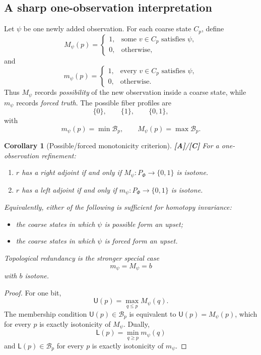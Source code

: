 \documentclass[11pt]{article}
\newtheorem{corollary}[theorem]{Corollary}
\theoremstyle{definition}
\newcommand{\statusA}{\textbf{[A]}}
\newcommand{\statusC}{\textbf{[C]}}
\begin{document}
\subsection{A sharp one-observation interpretation}

Let \(\psi\) be one newly added observation. For each coarse state \(C_p\), define
\[
M_\psi(p)=
\begin{cases}
1,&\text{some }v\in C_p\text{ satisfies }\psi,\\
0,&\text{otherwise},
\end{cases}
\]
and
\[
m_\psi(p)=
\begin{cases}
1,&\text{every }v\in C_p\text{ satisfies }\psi,\\
0,&\text{otherwise}.
\end{cases}
\]
Thus \(M_\psi\) records \emph{possibility} of the new observation inside a coarse state, while \(m_\psi\) records \emph{forced truth}. The possible fiber profiles are
\[
\{0\},\qquad\{1\},\qquad\{0,1\},
\]
with
\[
m_\psi(p)=\min\mathcal B_p,
\qquad
M_\psi(p)=\max\mathcal B_p.
\]

\begin{corollary}[Possible/forced monotonicity criterion]\label{cor:possibleforced}
\statusA/\statusC\;
For a one-observation refinement:
\begin{enumerate}[label=(\roman*)]
\item \(r\) has a right adjoint if and only if \(M_\psi:P_\Phi\to\{0,1\}\) is isotone.
\item \(r\) has a left adjoint if and only if \(m_\psi:P_\Phi\to\{0,1\}\) is isotone.
\end{enumerate}
Equivalently, either of the following is sufficient for homotopy invariance:
\begin{itemize}
\item the coarse states in which \(\psi\) is \emph{possible} form an upset;
\item the coarse states in which \(\psi\) is \emph{forced} form an upset.
\end{itemize}
Topological redundancy is the stronger special case
\[
m_\psi=M_\psi=b
\]
with \(b\) isotone.
\end{corollary}

\begin{proof}
For one bit,
\[
\mathsf U(p)=\max_{q\le p}M_\psi(q).
\]
The membership condition \(\mathsf U(p)\in\mathcal B_p\) is equivalent to \(\mathsf U(p)=M_\psi(p)\), which for every \(p\) is exactly isotonicity of \(M_\psi\). Dually,
\[
\mathsf L(p)=\min_{q\ge p}m_\psi(q)
\]
and \(\mathsf L(p)\in\mathcal B_p\) for every \(p\) is exactly isotonicity of \(m_\psi\).
\end{proof}
\end{document}

